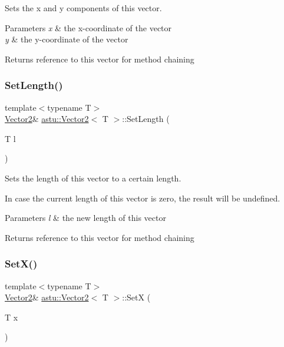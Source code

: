Sets the x and y components of this vector.


\begin{DoxyParams}{Parameters}
{\em x} & the x-\/coordinate of the vector \\
\hline
{\em y} & the y-\/coordinate of the vector \\
\hline
\end{DoxyParams}
\begin{DoxyReturn}{Returns}
reference to this vector for method chaining 
\end{DoxyReturn}
\mbox{\label{classastu_1_1Vector2_afeae7c216e2c0846f576a11563a6404c}} 
\subsubsection{\texorpdfstring{Set\+Length()}{SetLength()}}
{\footnotesize\ttfamily template$<$typename T$>$ \\
\hyperlink{classastu_1_1Vector2}{Vector2}\& \hyperlink{classastu_1_1Vector2}{astu\+::\+Vector2}$<$ T $>$\+::Set\+Length (\begin{DoxyParamCaption}\item[{T}]{l }\end{DoxyParamCaption})\hspace{0.3cm}{\ttfamily [inline]}}

Sets the length of this vector to a certain length.

In case the current length of this vector is zero, the result will be undefined.


\begin{DoxyParams}{Parameters}
{\em l} & the new length of this vector \\
\hline
\end{DoxyParams}
\begin{DoxyReturn}{Returns}
reference to this vector for method chaining 
\end{DoxyReturn}
\mbox{\label{classastu_1_1Vector2_adf5c57f8b6f337a4aa6eb79c0506d074}} 
\subsubsection{\texorpdfstring{Set\+X()}{SetX()}}
{\footnotesize\ttfamily template$<$typename T$>$ \\
\hyperlink{classastu_1_1Vector2}{Vector2}\& \hyperlink{classastu_1_1Vector2}{astu\+::\+Vector2}$<$ T $>$\+::SetX (\begin{DoxyParamCaption}\item[{T}]{x }\end{DoxyParamCaption})\hspace{0.3cm}{\ttfamily [inline]}}

